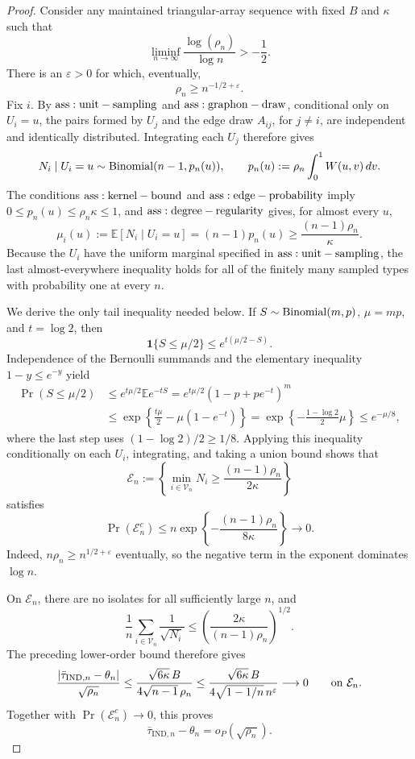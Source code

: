 \documentclass{article}
\begin{document}
\begin{proof}
Consider any maintained triangular-array sequence with fixed \(B\) and \(\kappa\) such that
\[
 \liminf_{n\to\infty}\frac{\log(\rho_n)}{\log n}>-\frac12.
\]
There is an \(\varepsilon>0\) for which, eventually,
\[
 \rho_n\ge n^{-1/2+\varepsilon}.
\]
Fix \(i\).  By \({\rm ass:unit-sampling}\) and \({\rm ass:graphon-draw}\), conditional only on \(U_i=u\), the pairs formed by \(U_j\) and the edge draw \(A_{ij}\), for \(j\ne i\), are independent and identically distributed.  Integrating each \(U_j\) therefore gives
\[
 N_i\mid U_i=u\sim{\rm Binomial}(n-1,p_n(u)),
 \qquad
 p_n(u):=\rho_n\int_0^1W(u,v)\,dv.
\]
The conditions \({\rm ass:kernel-bound}\) and \({\rm ass:edge-probability}\) imply \(0\le p_n(u)\le\rho_n\kappa\le1\), and \({\rm ass:degree-regularity}\) gives, for almost every \(u\),
\[
 \mu_i(u):=\mathbb E[N_i\mid U_i=u]
 =(n-1)p_n(u)
 \ge\frac{(n-1)\rho_n}{\kappa}.
\]
Because the \(U_i\) have the uniform marginal specified in \({\rm ass:unit-sampling}\), the last almost-everywhere inequality holds for all of the finitely many sampled types with probability one at every \(n\).

We derive the only tail inequality needed below.  If \(S\sim{\rm Binomial}(m,p)\), \(\mu=mp\), and \(t=\log2\), then
\[
 \mathbf1\{S\le\mu/2\}\le e^{t(\mu/2-S)}.
\]
Independence of the Bernoulli summands and the elementary inequality \(1-y\le e^{-y}\) yield
\[
\begin{aligned}
 \Pr(S\le\mu/2)
 &\le e^{t\mu/2}\mathbb Ee^{-tS}
 =e^{t\mu/2}(1-p+pe^{-t})^m\\
 &\le\exp\!\left\{\frac{t\mu}{2}-\mu(1-e^{-t})\right\}
 =\exp\!\left\{-\frac{1-\log2}{2}\mu\right\}
 \le e^{-\mu/8},
\end{aligned}
\]
where the last step uses \((1-\log2)/2\ge1/8\).  Applying this inequality conditionally on each \(U_i\), integrating, and taking a union bound shows that
\[
 \mathcal E_n:=\left\{\min_{i\in\mathcal V_n}N_i
 \ge\frac{(n-1)\rho_n}{2\kappa}\right\}
\]
satisfies
\[
 \Pr(\mathcal E_n^c)
 \le n\exp\!\left\{-\frac{(n-1)\rho_n}{8\kappa}\right\}
 \longrightarrow0.
\]
Indeed, \(n\rho_n\ge n^{1/2+\varepsilon}\) eventually, so the negative term in the exponent dominates \(\log n\).

On \(\mathcal E_n\), there are no isolates for all sufficiently large \(n\), and
\[
 \frac1n\sum_{i\in\mathcal V_n}\frac1{\sqrt{N_i}}
 \le\left(\frac{2\kappa}{(n-1)\rho_n}\right)^{1/2}.
\]
The preceding lower-order bound therefore gives
\[
 \frac{|\bar\tau_{\mathrm{IND},n}-\theta_n|}{\sqrt{\rho_n}}
 \le\frac{\sqrt{6\kappa}\,B}{4\sqrt{n-1}\,\rho_n}
 \le\frac{\sqrt{6\kappa}\,B}{4\sqrt{1-1/n}\,n^\varepsilon}
 \longrightarrow0
 \qquad\hbox{on }\mathcal E_n.
\]
Together with \(\Pr(\mathcal E_n^c)\to0\), this proves
\[
 \bar\tau_{\mathrm{IND},n}-\theta_n=o_P(\sqrt{\rho_n}).
\]


\end{proof}
\end{document}
